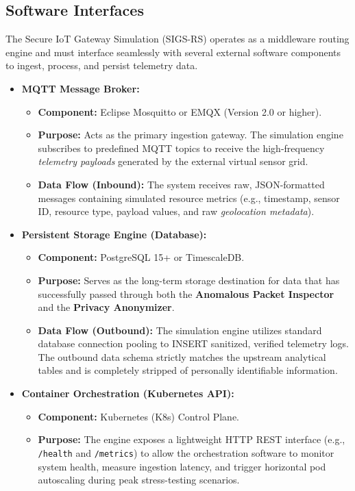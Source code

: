 \documentclass[12pt,letterpaper]{article}
\begin{document}
\subsection{Software Interfaces}
The Secure IoT Gateway Simulation (SIGS-RS) operates as a middleware routing engine and must interface seamlessly with several external software components to ingest, process, and persist telemetry data.

\begin{itemize}
\item \textbf{MQTT Message Broker:}
\begin{itemize}
\item \textbf{Component:} Eclipse Mosquitto or EMQX (Version 2.0 or higher).
\item \textbf{Purpose:} Acts as the primary ingestion gateway. The simulation engine subscribes to predefined MQTT topics to receive the high-frequency \emph{telemetry payloads} generated by the external virtual sensor grid.
\item \textbf{Data Flow (Inbound):} The system receives raw, JSON-formatted messages containing simulated resource metrics (e.g., timestamp, sensor ID, resource type, payload values, and raw \emph{geolocation metadata}).
\end{itemize}

\item \textbf{Persistent Storage Engine (Database):}
\begin{itemize}
\item \textbf{Component:} PostgreSQL 15+ or TimescaleDB.
\item \textbf{Purpose:} Serves as the long-term storage destination for data that has successfully passed through both the \textbf{Anomalous Packet Inspector} and the \textbf{Privacy Anonymizer}.
\item \textbf{Data Flow (Outbound):} The simulation engine utilizes standard database connection pooling to INSERT sanitized, verified telemetry logs. The outbound data schema strictly matches the upstream analytical tables and is completely stripped of personally identifiable information.
\end{itemize}

\item \textbf{Container Orchestration (Kubernetes API):}
\begin{itemize}
\item \textbf{Component:} Kubernetes (K8s) Control Plane.
\item \textbf{Purpose:} The engine exposes a lightweight HTTP REST interface (e.g., \texttt{/health} and \texttt{/metrics}) to allow the orchestration software to monitor system health, measure ingestion latency, and trigger horizontal pod autoscaling during peak stress-testing scenarios.
\end{itemize}
\end{itemize}
\end{document}
